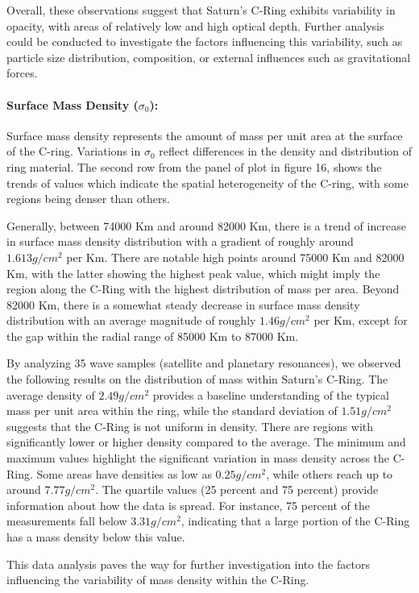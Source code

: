 \documentclass{article}
\begin{document}
Overall, these observations suggest that Saturn's C-Ring exhibits variability in opacity, with areas of relatively low and high optical depth. Further analysis could be conducted to investigate the factors influencing this variability, such as particle size distribution, composition, or external influences such as gravitational forces.

\paragraph{Surface Mass Density ($\sigma_{0}$):}
Surface mass density represents the amount of mass per unit area at the surface of the C-ring. Variations in $\sigma_{0}$ reflect differences in the density and distribution of ring material. The second row from the panel of plot in figure 16, shows the trends of values which indicate the spatial heterogeneity of the C-ring, with some regions being denser than others. 

Generally, between 74000 Km and around 82000 Km, there is a trend of increase in surface mass density distribution with a gradient of roughly around $1.613 g/cm^{2}$ per Km. There are notable high points around 75000 Km and 82000 Km, with the latter showing the highest peak value, which might imply the region along the C-Ring with the highest distribution of mass per area. Beyond 82000 Km, there is a somewhat steady decrease in surface mass density distribution with an average magnitude of roughly $1.46g/cm^{2}$ per Km, except for the gap within the radial range of 85000 Km to 87000 Km.

By analyzing 35 wave samples (satellite and planetary resonances), we observed the following results on the distribution of mass within Saturn's C-Ring. The average density of $2.49 g/cm^{2}$ provides a baseline understanding of the typical mass per unit area within the ring, while the standard deviation of $1.51 g/cm^{2}$ suggests that the C-Ring is not uniform in density. There are regions with significantly lower or higher density compared to the average. The minimum and maximum values highlight the significant variation in mass density across the C-Ring. Some areas have densities as low as $0.25 g/cm^{2}$, while others reach up to around $7.77 g/cm^{2}$. The quartile values (25 percent and 75 percent) provide information about how the data is spread.  For instance, 75 percent of the measurements fall below $3.31 g/cm^{2}$, indicating that a large portion of the C-Ring has a mass density below this value.

This data analysis paves the way for further investigation into the factors influencing the variability of mass density within the C-Ring.
\end{document}
